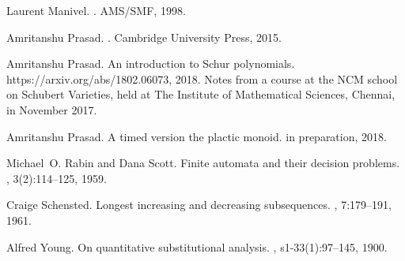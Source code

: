 \documentclass[10pt]{amsproc}
\theoremstyle{definition}
\theoremstyle{remark}
\begin{document}
\begin{thebibliography}{Pra18b}
Laurent Manivel.
.
\newblock AMS/SMF, 1998.

Amritanshu Prasad.
.
\newblock Cambridge University Press, 2015.

Amritanshu Prasad.
\newblock An introduction to {S}chur polynomials.
\newblock https://arxiv.org/abs/1802.06073, 2018.
\newblock Notes from a course at the NCM school on Schubert Varieties, held at
  The Institute of Mathematical Sciences, Chennai, in November 2017.

Amritanshu Prasad.
\newblock A timed version the plactic monoid.
\newblock in preparation, 2018.

Michael~O. Rabin and Dana Scott.
\newblock Finite automata and their decision problems.
, 3(2):114--125, 1959.

Craige Schensted.
\newblock Longest increasing and decreasing subsequences.
, 7:179--191, 1961.

Alfred Young.
\newblock On quantitative substitutional analysis.
,
  s1-33(1):97--145, 1900.

\end{thebibliography}
\end{document}
